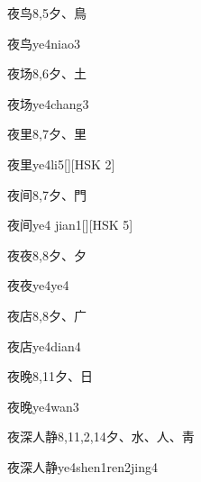 \begin{Entry}{夜鸟}{8,5}{⼣、⿃}
  \begin{Phonetics}{夜鸟}{ye4niao3}
  \end{Phonetics}
\end{Entry}

\begin{Entry}{夜场}{8,6}{⼣、⼟}
  \begin{Phonetics}{夜场}{ye4chang3}
  \end{Phonetics}
\end{Entry}

\begin{Entry}{夜里}{8,7}{⼣、⾥}
  \begin{Phonetics}{夜里}{ye4li5}[][HSK 2]
  \end{Phonetics}
\end{Entry}

\begin{Entry}{夜间}{8,7}{⼣、⾨}
  \begin{Phonetics}{夜间}{ye4 jian1}[][HSK 5]
  \end{Phonetics}
\end{Entry}

\begin{Entry}{夜夜}{8,8}{⼣、⼣}
  \begin{Phonetics}{夜夜}{ye4ye4}
  \end{Phonetics}
\end{Entry}

\begin{Entry}{夜店}{8,8}{⼣、⼴}
  \begin{Phonetics}{夜店}{ye4dian4}
  \end{Phonetics}
\end{Entry}

\begin{Entry}{夜晚}{8,11}{⼣、⽇}
  \begin{Phonetics}{夜晚}{ye4wan3}
  \end{Phonetics}
\end{Entry}

\begin{Entry}{夜深人静}{8,11,2,14}{⼣、⽔、⼈、⾭}
  \begin{Phonetics}{夜深人静}{ye4shen1ren2jing4}
  \end{Phonetics}
\end{Entry}

